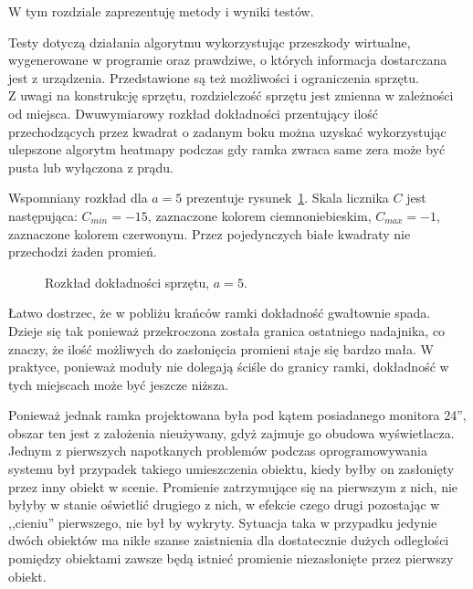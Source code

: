 \label{ch:tests}

W tym rozdziale zaprezentuję metody i wyniki testów.

Testy dotyczą działania algorytmu wykorzystując przeszkody wirtualne, wygenerowane w programie oraz prawdziwe, o których informacja dostarczana jest z urządzenia. Przedstawione są też możliwości i ograniczenia sprzętu.\\

Z uwagi na konstrukcję sprzętu, rozdzielczość sprzętu jest zmienna w zależności od miejsca. Dwuwymiarowy rozkład dokładności przentujący ilość przechodzących przez kwadrat o zadanym boku można uzyskać wykorzystując ulepszone algorytm heatmapy podczas gdy ramka zwraca same zera \pauza może być pusta lub wyłączona z prądu.

Wspomniany rozkład dla $a = 5$ prezentuje rysunek~\ref{fig:scene_heatmap2_resolution_5}. Skala licznika $C$ jest następująca: $C_{min} = -15$, zaznaczone kolorem ciemnoniebieskim, $C_{max} = -1$, zaznaczone kolorem czerwonym. Przez pojedynczych białe kwadraty nie przechodzi żaden promień.

\begin{figure}
 \centering
 \makebox[\textwidth][r]{
  \resizebox{.9\largefigure}{!}{
    \def\svgwidth{0.9\largefigure}
    
  }
 }
 \caption{Rozkład dokładności sprzętu, $a = 5$.}
 \label{fig:scene_heatmap2_resolution_5}
\end{figure}

Łatwo dostrzec, że w pobliżu krańców ramki dokładność gwałtownie spada. Dzieje się tak ponieważ przekroczona została granica ostatniego nadajnika, co znaczy, że ilość możliwych do zasłonięcia promieni staje się bardzo mała. W praktyce, ponieważ moduły nie dolegają ściśle do granicy ramki, dokładność w tych miejscach może być jeszcze niższa.

Ponieważ jednak ramka projektowana była pod kątem posiadanego monitora 24'', obszar ten jest z założenia nieużywany, gdyż zajmuje go obudowa wyświetlacza.\\

Jednym z pierwszych napotkanych problemów podczas oprogramowywania systemu był przypadek takiego umieszczenia obiektu, kiedy byłby on zasłonięty przez inny obiekt w scenie. Promienie zatrzymujące się  na pierwszym z nich, nie byłyby w stanie oświetlić drugiego z nich, w efekcie czego drugi pozostając w ,,cieniu'' pierwszego, nie był by wykryty. Sytuacja taka w przypadku jedynie dwóch obiektów ma nikłe szanse zaistnienia \pauza dla dostatecznie dużych odległości pomiędzy obiektami zawsze będą istnieć promienie niezasłonięte przez pierwszy obiekt.

